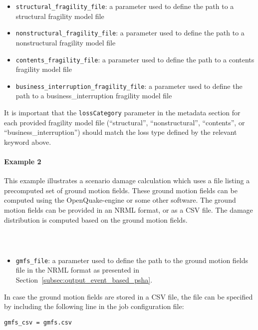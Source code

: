 \begin{itemize}

  \item \Verb+structural_fragility_file+: a parameter used to define the path
    to a structural \gls{fragility model} file

  \item \Verb+nonstructural_fragility_file+: a parameter used to define the path
    to a nonstructural \gls{fragility model} file

  \item \Verb+contents_fragility_file+: a parameter used to define the path
    to a contents \gls{fragility model} file

  \item \Verb+business_interruption_fragility_file+: a parameter used to define
    the path to a business_interruption \gls{fragility model} file

\end{itemize}

It is important that the \Verb+lossCategory+ parameter in the metadata section
for each provided fragility model file (``structural'', ``nonstructural'',
``contents'', or ``business\_interruption'') should match the loss type
defined by the relevant keyword above.


\paragraph{Example 2}

This example illustrates a scenario damage calculation which uses a file
listing a precomputed set of ground motion fields. These ground motion fields
can be computed using the OpenQuake-engine or some other software. The ground
motion fields can be provided in an NRML format, or as a CSV file. The damage
distribution is computed based on the ground motion fields.

\inputminted[firstline=1,firstnumber=1,fontsize=\footnotesize,frame=single,linenos,bgcolor=lightgray]{ini}{oqum/risk/Verbatim/config_scenario_damage_gmf.ini}\\

\begin{itemize}

  \item \Verb+gmfs_file+: a parameter used to define the path
	to the ground motion fields file in the NRML format as presented in
	Section~\ref{subsec:output_event_based_psha}.

\end{itemize}

In case the ground motion fields are stored in a CSV file, the file can be
specified by including the following line in the job configuration file:

\begin{Verbatim}[frame=single, commandchars=\\\{\}, samepage=true]
gmfs_csv = gmfs.csv
\end{Verbatim}

